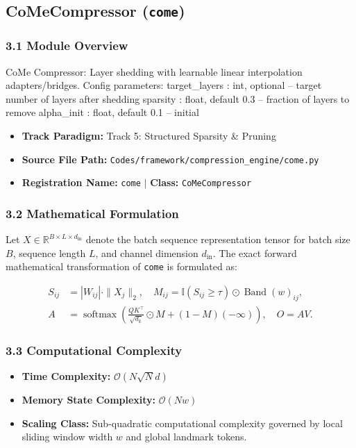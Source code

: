 \subsection{CoMeCompressor (\texttt{come})}
\label{sec:app_module_come}

\subsubsection*{3.1 Module Overview}
CoMe Compressor: Layer shedding with learnable linear interpolation adapters/bridges.  Config parameters:     target\_layers : int, optional -- target number of layers after shedding     sparsity      : float, default 0.3 -- fraction of layers to remove     alpha\_init    : float, default 0.1 -- initial
\begin{itemize}
    \item \textbf{Track Paradigm:} Track 5: Structured Sparsity & Pruning
    \item \textbf{Source File Path:} \texttt{Codes/framework/compression\_engine/come.py}
    \item \textbf{Registration Name:} \texttt{come} $\mid$ \textbf{Class:} \texttt{CoMeCompressor}
\end{itemize}

\subsubsection*{3.2 Mathematical Formulation}
Let $X \in \mathbb{R}^{B \times L \times d_{\text{in}}}$ denote the batch sequence representation tensor for batch size $B$, sequence length $L$, and channel dimension $d_{\text{in}}$. The exact forward mathematical transformation of \texttt{come} is formulated as:

\begin{align}
S_{ij} &= |W_{ij}| \cdot \|X_j\|_2, \quad M_{ij} = \mathbb{I}(S_{ij} \ge \tau) \odot \operatorname{Band}(w)_{ij}, \\
A &= \operatorname{softmax}\left(\frac{Q K^\top}{\sqrt{d_k}} \odot M + (1 - M)(-\infty)\right), \quad O = A V.
\end{align}


\subsubsection*{3.3 Computational Complexity}
\begin{itemize}
    \item \textbf{Time Complexity:} $\mathcal{O}(N \sqrt{N} d)$
    \item \textbf{Memory State Complexity:} $\mathcal{O}(N w)$
    \item \textbf{Scaling Class:} Sub-quadratic computational complexity governed by local sliding window width $w$ and global landmark tokens.
\end{itemize}

